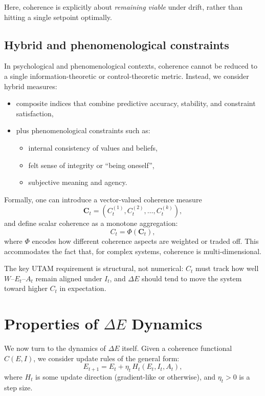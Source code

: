 \documentclass[12pt,a4paper]{report}
\newcommand{\Will}{W}
\begin{document}
Here, coherence is explicitly about \emph{remaining viable} under drift, rather than hitting a single setpoint optimally.

\subsection*{Hybrid and phenomenological constraints}

In psychological and phenomenological contexts, coherence cannot be reduced to a single information-theoretic or control-theoretic metric. Instead, we consider hybrid measures:

\begin{itemize}[leftmargin=2em]
    \item composite indices that combine predictive accuracy, stability, and constraint satisfaction,
    \item plus phenomenological constraints such as:
    \begin{itemize}
        \item internal consistency of values and beliefs,
        \item felt sense of integrity or ``being oneself'',
        \item subjective meaning and agency.
    \end{itemize}
\end{itemize}

Formally, one can introduce a vector-valued coherence measure
\[
    \mathbf{C}_t = (C_t^{(1)}, C_t^{(2)}, \dots, C_t^{(k)}),
\]
and define scalar coherence as a monotone aggregation:
\[
    C_t = \Phi(\mathbf{C}_t),
\]
where \(\Phi\) encodes how different coherence aspects are weighted or traded off. This accommodates the fact that, for complex systems, coherence is multi-dimensional.

The key UTAM requirement is structural, not numerical: \(C_t\) must track how well \(\Will\)–\(E_t\)–\(A_t\) remain aligned under \(I_t\), and $\Delta E$ should tend to move the system toward higher \(C_t\) in expectation.

\section{Properties of \texorpdfstring{$\Delta E$}{ΔE} Dynamics}

We now turn to the dynamics of $\Delta E$ itself. Given a coherence functional \(C(E, I)\), we consider update rules of the general form:
\[
    E_{t+1} = E_t + \eta_t \, H_t(E_t, I_t, A_t),
\]
where \(H_t\) is some update direction (gradient-like or otherwise), and \(\eta_t > 0\) is a step size.
\end{document}
